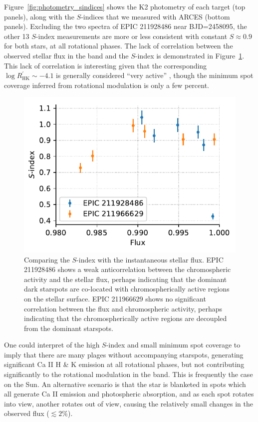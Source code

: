 Figure~\ref{fig:photometry_sindices} shows the K2 photometry of each target (top panels), along with the $S$-indices that we measured with ARCES (bottom panels). Excluding the two spectra of EPIC 211928486 near BJD=2458095, the other 13 $S$-index measurements are more or less consistent with constant $S\approx 0.9$ for both stars, at all rotational phases. The lack of correlation between the observed stellar flux in the \kepler band and the $S$-index is demonstrated in Figure~\ref{fig:sind_corr}. This lack of correlation is interesting given that the corresponding $\log R^\prime_\mathrm{HK} \sim -4.1$ is generally considered ``very active'' \citep{Wright2004}, though the minimum spot coverage inferred from rotational modulation is only a few percent. 

\begin{figure}
    \centering
    \includegraphics[scale=1]{nephelion/sind_flux_corr.pdf}
    \caption{Comparing the $S$-index with the instantaneous stellar flux. EPIC 211928486 shows a weak anticorrelation between the chromospheric activity and the stellar flux, perhaps indicating that the dominant dark starspots are co-located with chromospherically active regions on the stellar surface. EPIC 211966629 shows no significant correlation between the flux and chromospheric activity, perhaps indicating that the chromospherically active regions are decoupled from the dominant starspots.}
    \label{fig:sind_corr}
\end{figure}

One could interpret of the high $S$-index and small minimum spot coverage to imply that there are many plages without accompanying starspots, generating significant Ca II H \& K emission at all rotational phases, but not contributing significantly to the rotational modulation in the \kepler band. This is frequently the case on the Sun. An alternative scenario is that the star is blanketed in spots which all generate Ca II emission and photospheric absorption, and as each spot rotates into view, another rotates out of view, causing the relatively small changes in the observed \kepler flux ($\lesssim 2\%$). 

